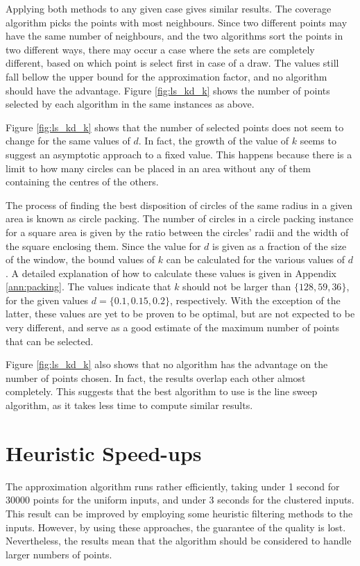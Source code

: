 Applying both methods to any given case gives similar results. The coverage algorithm picks the points with most neighbours. Since two different points may have the same number of neighbours, and the two algorithms sort the points in two different ways, there may occur a case where the sets are completely different, based on which point is select first in case of a draw. The values still fall bellow the upper bound for the approximation factor, and no algorithm should have the advantage. Figure \ref{fig:ls_kd_k} shows the number of points selected by each algorithm in the same instances as above.



Figure \ref{fig:ls_kd_k} shows  that the number of selected points does not seem to change for the same values of $d$. In fact, the growth of the value of $k$ seems to suggest an asymptotic approach to a fixed value. This happens because there is a limit to how many circles can be placed in an area without any of them containing the centres of the others. 
	
The process of finding the best disposition of circles of the same radius in a given area is known as circle packing. The number of circles in a circle packing instance for a square area is given by the ratio between the circles' radii and the width of the square enclosing them. Since the value for $d$ is given as a fraction of the size of the window, the bound values of $k$ can be calculated for the various values of $d$. A detailed explanation of how to calculate these values is given in Appendix \ref{ann:packing}. The values indicate that $k$ should not be larger than $\{128,59,36\}$, for the given values $d=\{0.1,0.15,0.2\}$, respectively. With the exception of the latter, these values are yet to be proven to be optimal, but are not expected to be very different, and serve as a good estimate of the maximum number of points that can be selected.

Figure \ref{fig:ls_kd_k} also shows that no algorithm has the advantage on the number of points chosen. In fact, the results overlap each other almost completely. This suggests that the best algorithm to use is the line sweep algorithm, as it takes less time to compute similar results.

\section{Heuristic Speed-ups}
The approximation algorithm runs rather efficiently, taking under 1 second for 30000 points for the uniform inputs, and under 3 seconds for the clustered inputs. This result can be improved by employing some heuristic filtering methods to the inputs. However, by using these approaches, the guarantee of the quality is lost. Nevertheless, the results mean that the algorithm should be considered to handle larger numbers of points.
